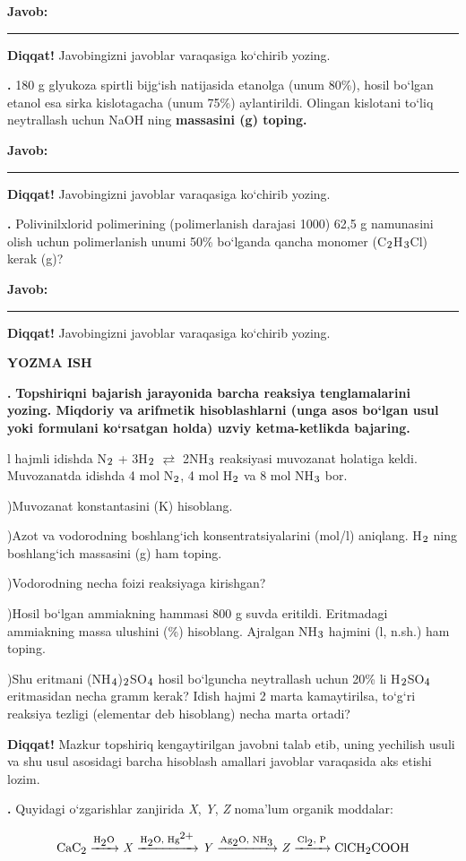 \documentclass[11pt,a4paper]{article}
\renewcommand{\textsubscript}[1]{\ensuremath{_{\text{\fontsize{8}{8}\selectfont #1}}}}
\renewcommand{\textsuperscript}[1]{\ensuremath{^{\text{\fontsize{8}{8}\selectfont #1}}}}
\newcommand{\qn}[1]{\textbf{\fontsize{11.5}{13}\selectfont #1}}
\newcommand{\qsep}{\par\vspace{1pt}\noindent\rule{0pt}{0.4pt}\par\vspace{5pt}}
\newcommand{\diqqat}[1]{\par\smallskip\noindent\textbf{Diqqat!} #1\par\medskip}
\newcommand{\javob}{\par\smallskip\noindent\textbf{Javob:} \rule[-2pt]{7.5cm}{0.4pt}\par\smallskip\noindent\textbf{Diqqat!} Javobingizni javoblar varaqasiga ko`chirib yozing.\par\medskip}
\begin{document}
\javob\qsep
\noindent\qn{39.} 180 g glyukoza spirtli bijg`ish natijasida etanolga (unum 80\%), hosil bo`lgan etanol esa sirka kislotagacha (unum 75\%) aylantirildi. Olingan kislotani to`liq neytrallash uchun NaOH ning \textbf{massasini (g) toping.}
\javob\qsep
\noindent\qn{40.} Polivinilxlorid polimerining (polimerlanish darajasi 1000) 62,5 g namunasini olish uchun polimerlanish unumi 50\% bo`lganda qancha monomer (C\textsubscript{2}H\textsubscript{3}Cl) kerak (g)?
\javob\qsep
\par\bigskip\begin{center}\textbf{\fontsize{13}{15}\selectfont YOZMA ISH}\end{center}
\noindent\qn{41.} \textbf{Topshiriqni bajarish jarayonida barcha reaksiya tenglamalarini yozing. Miqdoriy va arifmetik hisoblashlarni (unga asos bo`lgan usul yoki formulani ko`rsatgan holda) uzviy ketma-ketlikda bajaring.}\par{} l hajmli idishda N\textsubscript{2} + 3H\textsubscript{2} $\rightleftarrows$ 2NH\textsubscript{3} reaksiyasi muvozanat holatiga keldi. Muvozanatda idishda 4 mol N\textsubscript{2}, 4 mol H\textsubscript{2} va 8 mol NH\textsubscript{3} bor.\par
{})Muvozanat konstantasini (K) hisoblang.\par
{})Azot va vodorodning boshlang`ich konsentratsiyalarini (mol/l) aniqlang. H\textsubscript{2} ning boshlang`ich massasini (g) ham toping.\par
{})Vodorodning necha foizi reaksiyaga kirishgan?\par
{})Hosil bo`lgan ammiakning hammasi 800 g suvda eritildi. Eritmadagi ammiakning massa ulushini (\%) hisoblang. Ajralgan NH\textsubscript{3} hajmini (l, n.sh.) ham toping.\par
{})Shu eritmani (NH\textsubscript{4})\textsubscript{2}SO\textsubscript{4} hosil bo`lguncha neytrallash uchun 20\% li H\textsubscript{2}SO\textsubscript{4} eritmasidan necha gramm kerak? Idish hajmi 2 marta kamaytirilsa, to`g`ri reaksiya tezligi (elementar deb hisoblang) necha marta ortadi?\par
\diqqat{Mazkur topshiriq kengaytirilgan javobni talab etib, uning yechilish usuli va shu usul asosidagi barcha hisoblash amallari javoblar varaqasida aks etishi lozim.}\qsep
\noindent\qn{42.} Quyidagi o`zgarishlar zanjirida \textit{X}, \textit{Y}, \textit{Z} noma'lum organik moddalar:\par
\[\setlength{\fboxsep}{0pt}\text{CaC\textsubscript{2}}\xrightarrow{\text{H\textsubscript{2}O}}\text{\textit{X}}\xrightarrow{\text{H\textsubscript{2}O, Hg\textsuperscript{2+}}}\text{\textit{Y}}\xrightarrow{\text{Ag\textsubscript{2}O, NH\textsubscript{3}}}\text{\textit{Z}}\xrightarrow{\text{Cl\textsubscript{2}, P}}\text{ClCH\textsubscript{2}COOH}\]
\end{document}
